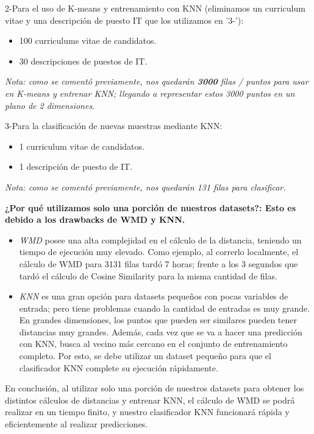 \documentclass[12pt,a4paper]{article}
\begin{document}
\begin{sloppypar}
2-Para el uso de K-means y entrenamiento con KNN (eliminamos un curriculum vitae y una descripción de puesto IT que los utilizamos en '3-'):
\begin{itemize}
\item 100 curriculums vitae de candidatos.
\item 30 descripciones de puestos de IT.
\end{itemize}        
\textit{Nota: como se comentó previamente, nos quedarán \textbf{3000} filas / puntos para usar en K-means y entrenar KNN; llegando a representar estos 3000 puntos en un plano de 2 dimensiones.}

3-Para la clasificación de nuevas muestras mediante KNN:
\begin{itemize}
\item 1 curriculum vitae de candidatos.
\item 1 descripción de puesto de IT.
\end{itemize}
\textit{Nota: como se comentó previamente, nos quedarán 131 filas para clasificar.}

\cleardoublepage

\textbf{¿Por qué utilizamos solo una porción de nuestros datasets?: Esto es debido a los drawbacks de WMD y KNN.}
\begin{itemize}
\item \textit{WMD} posee una alta complejidad en el cálculo de la distancia, teniendo un tiempo de ejecución muy elevado. Como ejemplo, al correrlo localmente, el cálculo de WMD para 3131 filas tardó 7 horas; frente a los 3 segundos que tardó el cálculo de Cosine Similarity para la misma cantidad de filas.
\item \textit{KNN} es una gran opción para datasets pequeños con pocas variables de entrada; pero tiene problemas cuando la cantidad de entradas es muy grande. En grandes dimensiones, los puntos que pueden ser similares pueden tener distancias muy grandes. Además, cada vez que se va a hacer una predicción con KNN, busca al vecino más cercano en el conjunto de entrenamiento completo. Por esto, se debe utilizar un dataset pequeño para que el clasificador KNN complete su ejecución rápidamente.
\end{itemize}
En conclusión, al utilizar solo una porción de nuestros datasets para obtener los distintos cálculos de distancias y entrenar KNN, el cálculo de WMD se podrá realizar en un tiempo finito, y nuestro clasificador KNN funcionará rápida y eficientemente al realizar predicciones.

\cleardoublepage


\end{sloppypar}
\end{document}
